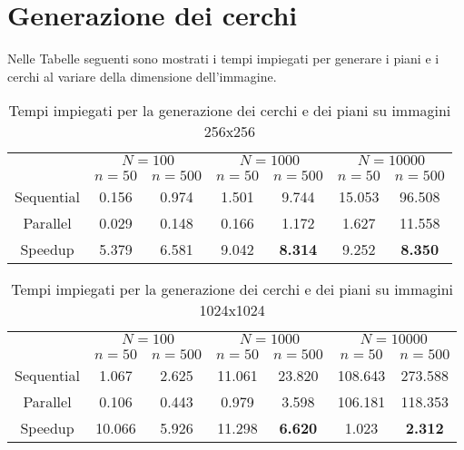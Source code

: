 \section{Generazione dei cerchi}\label{sec:generazione-dei-cerchi}
Nelle Tabelle seguenti sono mostrati i tempi impiegati per generare i piani e i cerchi al variare della dimensione dell'immagine.

\begin{table}[H]
    \centering
    \begin{tabular}{c|c|c|c|c|c|c|}
        & \multicolumn{2}{|c|}{$N = 100$} & \multicolumn{2}{|c|}{$N = 1000$} & \multicolumn{2}{|c|}{$N = 10000$} \\
        & $n=50$ & $n=500$ & $n=50$ & $n=500$ & $n=50$ & $n=500$ \\
        \hline
        Sequential & 0.156 & 0.974 & 1.501 & 9.744 & 15.053 & 96.508 \\
        Parallel & 0.029 & 0.148 & 0.166 & 1.172 & 1.627 & 11.558 \\
        Speedup & 5.379 & 6.581 & 9.042 & \textbf{8.314} & 9.252 & \textbf{8.350} \\
    \end{tabular}
    \caption{\label{tab:gen256}Tempi impiegati per la generazione dei cerchi e dei piani su immagini 256x256}
\end{table}

\begin{table}[H]
    \centering
    \begin{tabular}{c|c|c|c|c|c|c|}
        & \multicolumn{2}{|c|}{$N = 100$} & \multicolumn{2}{|c|}{$N = 1000$} & \multicolumn{2}{|c|}{$N = 10000$} \\
        & $n=50$ & $n=500$ & $n=50$ & $n=500$ & $n=50$ & $n=500$ \\
        \hline
        Sequential & 1.067 & 2.625 & 11.061 & 23.820 & 108.643 & 273.588 \\
        Parallel & 0.106 & 0.443 & 0.979 & 3.598 & 106.181 & 118.353 \\
        Speedup & 10.066 & 5.926 & 11.298 & \textbf{6.620} & 1.023 & \textbf{2.312} \\
    \end{tabular}
    \caption{\label{tab:gen1024}Tempi impiegati per la generazione dei cerchi e dei piani su immagini 1024x1024}
\end{table}